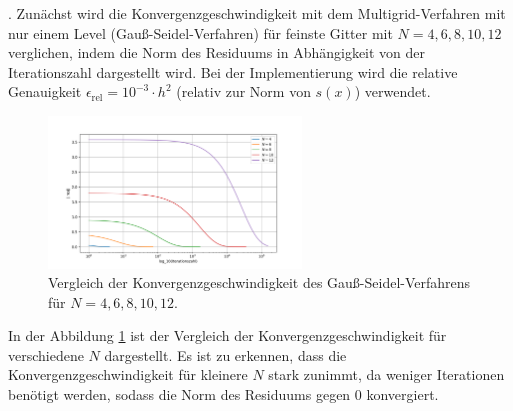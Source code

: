 \documentclass[11pt,a4paper]{article}
\begin{document}
. Zunächst wird die Konvergenzgeschwindigkeit mit dem Multigrid-Verfahren mit nur einem Level (Gauß-Seidel-Verfahren) für feinste Gitter mit $N = 4,6,8,10,12$ verglichen, indem die Norm des Residuums in Abhängigkeit von der
Iterationszahl dargestellt wird. Bei der Implementierung wird die relative Genauigkeit $\epsilon_{\mathrm{rel}} = 10^{-3} \cdot h^2$ (relativ zur Norm von $s(x)$) verwendet.
\begin{figure}[htbp]
    \centering
    \includegraphics[width=0.6\textwidth,scale=0.7]{h2_N_comparison_1}
    \caption[Vergleich der Konvergenzgeschwindigkeit des Gauß-Seidel-Verfahrens für $N = 4,6,8,10,12$.]{Vergleich der Konvergenzgeschwindigkeit des Gauß-Seidel-Verfahrens für $N = 4,6,8,10,12$.}\label{fig:h2_N_comparison_1}
\end{figure} In der Abbildung \ref{fig:h2_N_comparison_1} ist der Vergleich der Konvergenzgeschwindigkeit für verschiedene $N$ dargestellt. Es ist zu erkennen, dass
die Konvergenzgeschwindigkeit für kleinere $N$ stark zunimmt, da weniger Iterationen benötigt werden, sodass die Norm des Residuums gegen $0$ konvergiert.\\
\end{document}
